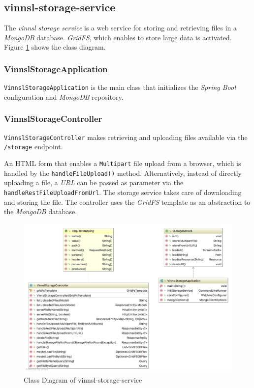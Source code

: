 \subsection{vinnsl-storage-service}\label{vinnsl-storage-service}

The \emph{vinnsl storage service} is a web service for storing and
retrieving files in a \emph{MongoDB} database. \emph{GridFS}, which
enables to store large data is activated. Figure
\ref{class_vinnsl-storage-service} shows the class diagram.

\subsubsection{VinnslStorageApplication}\label{vinnslstorageapplication}

\texttt{VinnslStorageApplication} is the main class that initializes the
\emph{Spring Boot} configuration and \emph{MongoDB} repository.

\subsubsection{VinnslStorageController}\label{vinnslstoragecontroller}

\texttt{VinnslStorageController} makes retrieving and uploading files
available via the \texttt{/storage} endpoint.

An HTML form that enables a \texttt{Multipart} file upload from a
browser, which is handled by the \texttt{handleFileUpload()} method.
Alternatively, instead of directly uploading a file, a \emph{URL} can be
passed as parameter via the \texttt{handleRestFileUploadFromUrl}. The
storage service takes care of downloading and storing the file. The
controller uses the \emph{GridFS} template as an abstraction to the
\emph{MongoDB} database.

\begin{figure}
\centering
\includegraphics[width=15.00000cm]{images/uml-class-diagram-vinnsl-storage-service}
\caption{Class Diagram of vinnsl-storage-service
\label{class_vinnsl-storage-service}}
\end{figure}

